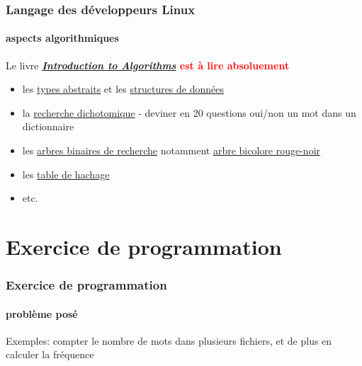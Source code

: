 \documentclass[xcolor=svgnames,final,smaller,a4]{beamer}
\begin{document}
\begin{frame}
  \frametitle{Langage des développeurs Linux}
  \framesubtitle{aspects algorithmiques}

  Le livre
  \textcolor{red}{\textbf{\href{https://en.wikipedia.org/wiki/Introduction_to_Algorithms}{\textit{Introduction
          to Algorithms}} est à lire absoluement}}

  \begin{itemize}

  \item les \href{https://fr.wikipedia.org/wiki/Type_abstrait}{types
    abstraits} et les
    \href{https://fr.wikipedia.org/wiki/Structure_de_données}{structures
      de données}
    
  \item la \href{https://fr.wikipedia.org/wiki/Recherche_dichotomique}{recherche dichotomique} - deviner en 20 questions oui/non un mot dans un dictionnaire

  \item les \href{https://fr.wikipedia.org/wiki/Arbre_binaire_de_recherche}{arbres binaires de recherche} notamment \href{https://fr.wikipedia.org/wiki/Arbre_bicolore}{arbre bicolore rouge-noir}

  \item les \href{https://fr.wikipedia.org/wiki/Table_de_hachage}{table de hachage}

  \item etc.
    
  \end{itemize}

  
\end{frame}





\section{Exercice de programmation}
\begin{frame}
  \frametitle{Exercice de programmation}
  \framesubtitle{problème posé}

  Exemples: compter le nombre de mots dans plusieurs fichiers, et de plus en calculer la fréquence
\end{frame}
\end{document}
